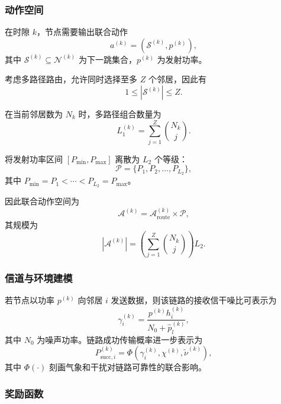 \subsubsection{动作空间}

在时隙 $k$，节点需要输出联合动作
\begin{equation}
a^{(k)}=\left(\mathcal{S}^{(k)},p^{(k)}\right),
\end{equation}
其中 $\mathcal{S}^{(k)}\subseteq\mathcal{N}^{(k)}$ 为下一跳集合，$p^{(k)}$ 为发射功率。

考虑多路径路由，允许同时选择至多 $Z$ 个邻居，因此有
\begin{equation}
1\leq |\mathcal{S}^{(k)}|\leq Z.
\end{equation}

在当前邻居数为 $N_k$ 时，多路径组合数量为
\begin{equation}
L_1^{(k)}=\sum_{j=1}^{Z}\binom{N_k}{j}.
\end{equation}

将发射功率区间 $[P_{\min},P_{\max}]$ 离散为 $L_2$ 个等级：
\begin{equation}
\mathcal{P}=\{P_1,P_2,\dots,P_{L_2}\},
\end{equation}
其中 $P_{\min}=P_1<\cdots<P_{L_2}=P_{\max}$。

因此联合动作空间为
\begin{equation}
\mathcal{A}^{(k)}=\mathcal{A}_{\text{route}}^{(k)}\times\mathcal{P},
\end{equation}
其规模为
\begin{equation}
|\mathcal{A}^{(k)}|=
\left(
\sum_{j=1}^{Z}\binom{N_k}{j}
\right)L_2.
\end{equation}

\subsubsection{信道与环境建模}

若节点以功率 $p^{(k)}$ 向邻居 $i$ 发送数据，则该链路的接收信干噪比可表示为
\begin{equation}
\gamma_i^{(k)}=
\frac{p^{(k)}h_i^{(k)}}
{N_0+\hat p_l^{(k)}},
\end{equation}
其中 $N_0$ 为噪声功率。链路成功传输概率进一步表示为
\begin{equation}
P_{\text{succ},i}^{(k)}=
\Phi\!\left(\gamma_i^{(k)},\chi^{(k)},\tilde{\nu}^{(k)}\right),
\end{equation}
其中 $\Phi(\cdot)$ 刻画气象和干扰对链路可靠性的联合影响。

\subsubsection{奖励函数}


